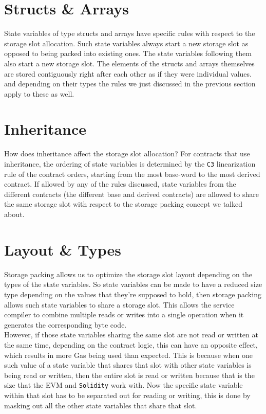 \section{Structs \& Arrays}
State variables of type structs and arrays have specific rules with respect to the storage slot allocation. Such state variables always start a new storage slot as opposed to being packed into existing ones. The state variables following them also start a new storage slot. The elements of the structs and arrays themselves are stored contiguously right after each other as if they were individual values. and depending on their types the rules we just discussed in the previous section apply to these as well.

\section{Inheritance}
How does inheritance affect the storage slot allocation? For contracts that use inheritance, the ordering of state variables is determined by the \verb|C3| linearization rule of the contract orders, starting from the most base-word to the most derived contract. If allowed by any of the rules discussed, state variables from the different contracts (the different base and derived contracts) are allowed to share the same storage slot with respect to the storage packing concept we talked about.

\section{Layout \& Types}
Storage packing allows us to optimize the storage slot layout depending on the types of the state variables. So state variables can be made to have a reduced size type depending on the values that they're supposed to hold, then storage packing allows such state variables to share a storage slot. This allows the service compiler to combine multiple reads or writes into a single operation when it generates the corresponding byte code.\\

However, if those state variables sharing the same slot are not read or written at the same time, depending on the contract logic, this can have an opposite effect, which results in more Gas being used than expected. This is because when one such value of a state variable that shares that slot with other state variables is being read or written, then the entire slot is read or written because that is the size that the EVM and \verb|Solidity| work with. Now the specific state variable within that slot has to be separated out for reading or writing, this is done by masking out all the other state variables that share that slot.\\

